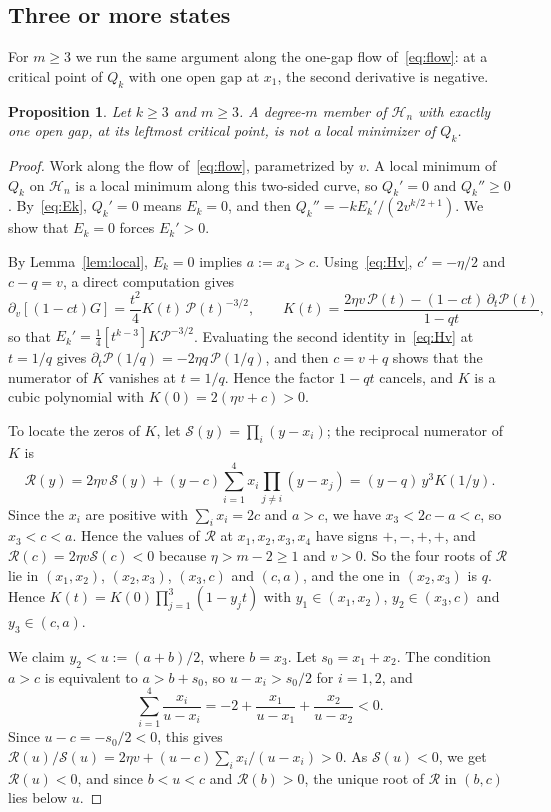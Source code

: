 \documentclass[11pt]{article}
\newtheorem{proposition}[theorem]{Proposition}
\theoremstyle{remark}
\newcommand{\HH}{\mathcal H}
\begin{document}
\subsection{Three or more states}
For $m\ge3$ we run the same argument along the one-gap flow
of~\eqref{eq:flow}: at a critical point of $Q_k$ with one open gap at
$x_1$, the second derivative is negative.

\begin{proposition}\label{prop:barrier}
Let $k\ge3$ and $m\ge3$. A degree-$m$ member of $\HH_n$ with exactly one
open gap, at its leftmost critical point, is not a local minimizer of $Q_k$.
\end{proposition}

\begin{proof}
Work along the flow of~\eqref{eq:flow}, parametrized by $v$. A local minimum
of $Q_k$ on $\HH_n$ is a local minimum along this two-sided curve, so
$Q_k'=0$ and $Q_k''\ge0$. By~\eqref{eq:Ek}, $Q_k'=0$ means $E_k=0$, and
then $Q_k''=-kE_k'/(2v^{k/2+1})$. We show that $E_k=0$ forces $E_k'>0$.

By Lemma~\ref{lem:local}, $E_k=0$ implies $a:=x_4>c$. Using~\eqref{eq:Hv},
$c'=-\eta/2$ and $c-q=v$, a direct computation gives
\[
\partial_v[(1-ct)G]=\frac{t^2}4K(t)\,\mathcal P(t)^{-3/2},\qquad
K(t)=\frac{2\eta v\,\mathcal P(t)-(1-ct)\,\partial_t\mathcal P(t)}{1-qt},
\]
so that $E_k'=\frac14[t^{k-3}]K\mathcal P^{-3/2}$. Evaluating the second
identity in~\eqref{eq:Hv} at $t=1/q$ gives
$\partial_t\mathcal P(1/q)=-2\eta q\,\mathcal P(1/q)$, and then $c=v+q$
shows that the numerator of $K$ vanishes at $t=1/q$. Hence the factor
$1-qt$ cancels, and $K$ is a cubic polynomial with $K(0)=2(\eta v+c)>0$.

To locate the zeros of $K$, let $\mathcal S(y)=\prod_i(y-x_i)$; the
reciprocal numerator of $K$ is
\[
\mathcal R(y)=2\eta v\,\mathcal S(y)+(y-c)\sum_{i=1}^4x_i\prod_{j\ne i}(y-x_j)
=(y-q)\,y^3K(1/y).
\]
Since the $x_i$ are positive with $\sum_ix_i=2c$ and $a>c$, we have
$x_3<2c-a<c$, so $x_3<c<a$. Hence the values of $\mathcal R$ at
$x_1,x_2,x_3,x_4$ have signs $+,-,+,+$, and
$\mathcal R(c)=2\eta v\mathcal S(c)<0$ because $\eta>m-2\ge1$ and $v>0$.
So the four roots of $\mathcal R$ lie in $(x_1,x_2)$, $(x_2,x_3)$, $(x_3,c)$
and $(c,a)$, and the one in $(x_2,x_3)$ is $q$. Hence
$K(t)=K(0)\prod_{j=1}^3(1-y_jt)$ with $y_1\in(x_1,x_2)$, $y_2\in(x_3,c)$
and $y_3\in(c,a)$.

We claim $y_2<u:=(a+b)/2$, where $b=x_3$. Let $s_0=x_1+x_2$. The condition
$a>c$ is equivalent to $a>b+s_0$, so $u-x_i>s_0/2$ for $i=1,2$, and
\[
\sum_{i=1}^4\frac{x_i}{u-x_i}=-2+\frac{x_1}{u-x_1}+\frac{x_2}{u-x_2}<0.
\]
Since $u-c=-s_0/2<0$, this gives
$\mathcal R(u)/\mathcal S(u)=2\eta v+(u-c)\sum_ix_i/(u-x_i)>0$. As
$\mathcal S(u)<0$, we get $\mathcal R(u)<0$, and since $b<u<c$ and
$\mathcal R(b)>0$, the unique root of $\mathcal R$ in $(b,c)$ lies below
$u$.


\end{proof}
\end{document}
